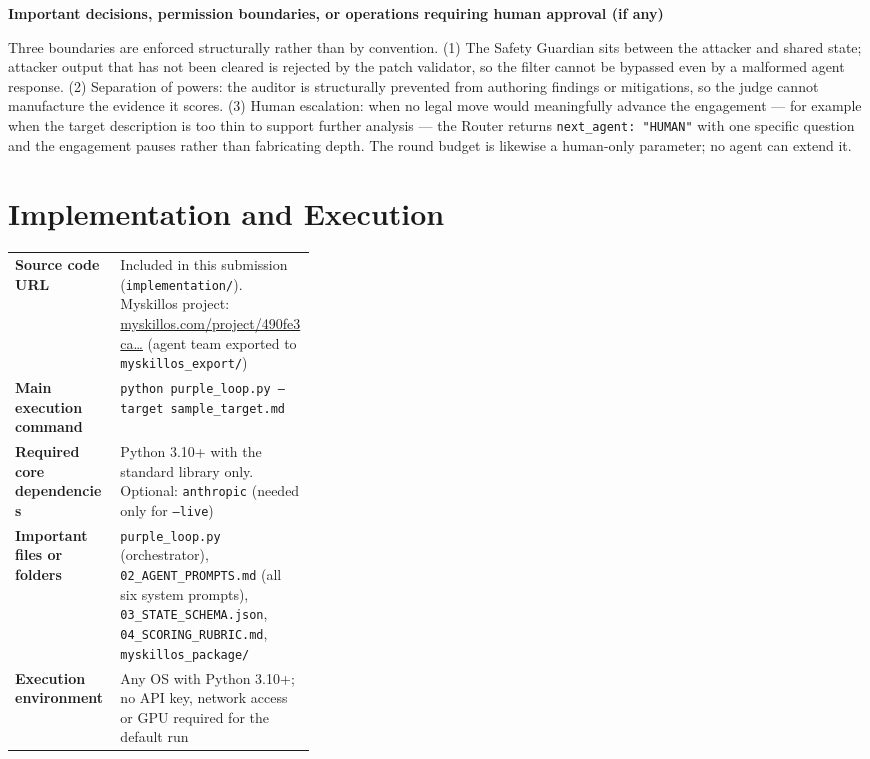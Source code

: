 \documentclass[11pt,a4paper]{article}
\newcommand{\qa}[2]{\textbf{#1}\par\vspace{-2pt}\begin{answerbox}#2\end{answerbox}}
\newcommand{\pl}{\texttt{purple\_loop.py}}
\begin{document}
\qa{Important decisions, permission boundaries, or operations requiring human approval (if any)}{%
Three boundaries are enforced structurally rather than by convention. (1) The Safety
Guardian sits between the attacker and shared state; attacker output that has not been
cleared is rejected by the patch validator, so the filter cannot be bypassed even by a
malformed agent response. (2) Separation of powers: the auditor is structurally prevented
from authoring findings or mitigations, so the judge cannot manufacture the evidence it
scores. (3) Human escalation: when no legal move would meaningfully advance the engagement
--- for example when the target description is too thin to support further analysis ---
the Router returns \texttt{next\_agent: "HUMAN"} with one specific question and the
engagement pauses rather than fabricating depth. The round budget is likewise a human-only
parameter; no agent can extend it.}

\section{Implementation and Execution}

\begin{tabularx}{\linewidth}{@{}L{0.35\linewidth}Y@{}}
\textbf{Source code URL} & Included in this submission (\texttt{implementation/}). Myskillos project: \href{https://www.myskillos.com/project/490fe3ca-64b6-4831-b7e5-17a67adf7724}{myskillos.com/project/490fe3ca…} (agent team exported to \texttt{myskillos\_export/}) \\
\textbf{Main execution command} & \texttt{python purple\_loop.py --target sample\_target.md} \\
\textbf{Required core dependencies} & Python 3.10+ with the standard library only. Optional: \texttt{anthropic} (needed only for \texttt{--live}) \\
\textbf{Important files or folders} & \pl{} (orchestrator), \texttt{02\_AGENT\_PROMPTS.md} (all six system prompts), \texttt{03\_STATE\_SCHEMA.json}, \texttt{04\_SCORING\_RUBRIC.md}, \texttt{myskillos\_package/} \\
\textbf{Execution environment} & Any OS with Python 3.10+; no API key, network access or GPU required for the default run \\
\end{tabularx}
\end{document}
